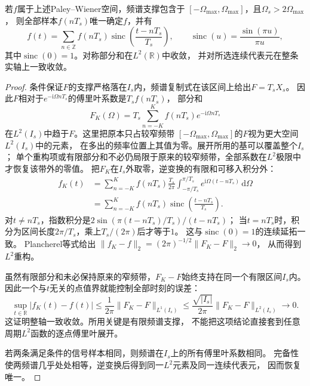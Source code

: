 \begin{theorem}[带限信号的采样重构]
  \label{thm:signal-analysis-sampling}
  若$f$属于上述Paley--Wiener空间，频谱支撑包含于
  $[-\Omega_{\max},\Omega_{\max}]$，且$\Omega_s>2\Omega_{\max}$，
  则全部样本$f(nT_s)$唯一确定$f$，并有
  \begin{equation}
    f(t)=\sum_{n\in\mathbb Z}f(nT_s)
    \operatorname{sinc}\left(\frac{t-nT_s}{T_s}\right),
    \qquad \operatorname{sinc}(u)=\frac{\sin(\pi u)}{\pi u},
    \label{eq:signal-analysis-sinc-reconstruction}
  \end{equation}
  其中$\operatorname{sinc}(0)=1$。对称部分和在$L^2(\mathbb R)$中收敛，
  并对所选连续代表元在整条实轴上一致收敛。
\end{theorem}
\begin{proof}
  条件保证$F$的支撑严格落在$I_s$内，频谱复制式在该区间上给出$F=T_sX_s$。
  因此$F$相对于$e^{-\mathrm i\Omega nT_s}$的傅里叶系数是$T_sf(nT_s)$，
  部分和
  \[
    F_K(\Omega)=T_s\sum_{n=-K}^{K}f(nT_s)e^{-\mathrm i\Omega nT_s}
  \]
  在$L^2(I_s)$中趋于$F$。这里把原本只占较窄频带
  $[-\Omega_{\max},\Omega_{\max}]$的$F$视为更大空间$L^2(I_s)$中的元素，
  在多出的频率位置上其值为零。展开所用的基可以覆盖整个$I_s$；
  单个重构项或有限部分和不必仍局限于原来的较窄频带，全部系数在$L^2$极限中才恢复该带外的零值。
  把$F_K$在$I_s$外取零，逆变换的有限和可移入积分外：
  \begin{align*}
    f_K(t)
    &=\sum_{n=-K}^{K}f(nT_s)\frac{T_s}{2\pi}
      \int_{-\pi/T_s}^{\pi/T_s}e^{\mathrm i\Omega(t-nT_s)}\,\mathrm d\Omega\\
    &=\sum_{n=-K}^{K}f(nT_s)
      \operatorname{sinc}\left(\frac{t-nT_s}{T_s}\right).
  \end{align*}
  对$t\neq nT_s$，指数积分是$2\sin(\pi(t-nT_s)/T_s)/(t-nT_s)$；
  当$t=nT_s$时，积分为区间长度$2\pi/T_s$，乘上$T_s/(2\pi)$后才等于$1$。
  这与$\operatorname{sinc}(0)=1$的连续延拓一致。
  Plancherel等式给出
  $\|f_K-f\|_2=(2\pi)^{-1/2}\|F_K-F\|_2\to0$，
  从而得到$L^2$重构。

  虽然有限部分和未必保持原来的窄频带，$F_K-F$始终支持在同一个有限区间$I_s$内。
  因此一个与$t$无关的点值界就能控制全部时刻的误差：
  \[
    \sup_{t\in\mathbb R}|f_K(t)-f(t)|
    \leq\frac1{2\pi}\|F_K-F\|_{L^1(I_s)}
    \leq\frac{\sqrt{|I_s|}}{2\pi}\|F_K-F\|_{L^2(I_s)}
    \longrightarrow0.
  \]
  这证明整轴一致收敛。所用关键是有限频谱支撑，
  不能把这项结论直接套到任意周期$L^2$函数的逐点傅里叶展开。

  若两条满足条件的信号样本相同，则频谱在$I_s$上的所有傅里叶系数相同。
  完备性使两频谱几乎处处相等，逆变换后得到同一$L^2$元素及同一连续代表元，
  因而恢复唯一。
\end{proof}

